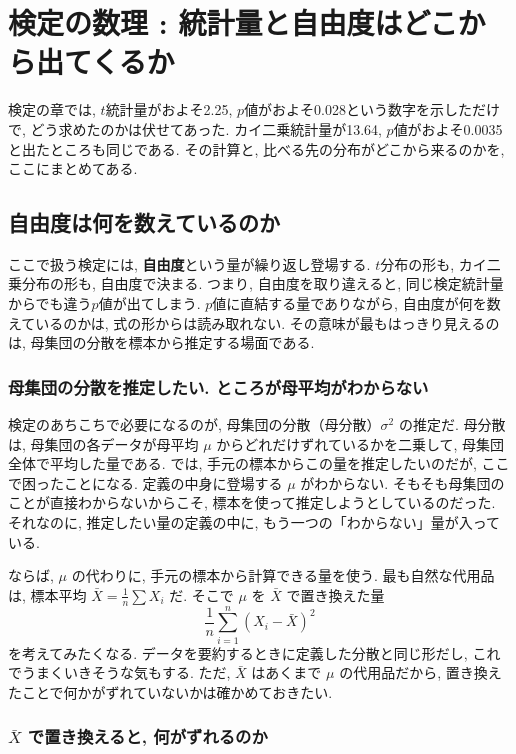 \section{検定の数理 : 統計量と自由度はどこから出てくるか}

    検定の章では, $t$統計量がおよそ2.25, $p$値がおよそ0.028という数字を示しただけで, どう求めたのかは伏せてあった.
    カイ二乗統計量が13.64, $p$値がおよそ0.0035と出たところも同じである.
    その計算と, 比べる先の分布がどこから来るのかを, ここにまとめてある.

  \subsection{自由度は何を数えているのか}

    ここで扱う検定には, \textbf{自由度}という量が繰り返し登場する.
    $t$分布の形も, カイ二乗分布の形も, 自由度で決まる.
    つまり, 自由度を取り違えると, 同じ検定統計量からでも違う$p$値が出てしまう.
    $p$値に直結する量でありながら, 自由度が何を数えているのかは, 式の形からは読み取れない.
    その意味が最もはっきり見えるのは, 母集団の分散を標本から推定する場面である.

    \subsubsection*{母集団の分散を推定したい. ところが母平均がわからない}

    検定のあちこちで必要になるのが, 母集団の分散（母分散）$\sigma^2$ の推定だ.
    母分散は, 母集団の各データが母平均 $\mu$ からどれだけずれているかを二乗して, 母集団全体で平均した量である.
    では, 手元の標本からこの量を推定したいのだが, ここで困ったことになる.
    定義の中身に登場する $\mu$ がわからない.
    そもそも母集団のことが直接わからないからこそ, 標本を使って推定しようとしているのだった.
    それなのに, 推定したい量の定義の中に, もう一つの「わからない」量が入っている.

    ならば, $\mu$ の代わりに, 手元の標本から計算できる量を使う.
    最も自然な代用品は, 標本平均 $\bar{X} = \frac{1}{n}\sum X_i$ だ.
    そこで $\mu$ を $\bar{X}$ で置き換えた量
    \[
      \frac{1}{n} \sum_{i=1}^n (X_i - \bar{X})^2
    \]
    を考えてみたくなる.
    データを要約するときに定義した分散と同じ形だし, これでうまくいきそうな気もする.
    ただ, $\bar{X}$ はあくまで $\mu$ の代用品だから, 置き換えたことで何かがずれていないかは確かめておきたい.

    \subsubsection*{\texorpdfstring{$\bar{X}$}{X̄} で置き換えると, 何がずれるのか}

